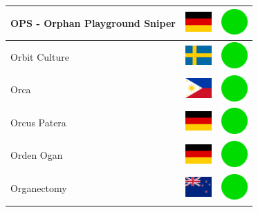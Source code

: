 \documentclass[12pt, a4paper, twoside]{report}
\begin{document}
\begin{center}
\begin{longtable}{|p{5cm}|p{2cm}|p{2cm}|}
 OPS - Orphan Playground Sniper                             & \includegraphics[width=1cm]{4x3/de} &   \includegraphics[width=1cm]{likes/y} \\ \hline
 Orbit Culture                                              & \includegraphics[width=1cm]{4x3/se} &   \includegraphics[width=1cm]{likes/y} \\ \hline
 Orca                                                       & \includegraphics[width=1cm]{4x3/ph} &   \includegraphics[width=1cm]{likes/y} \\ \hline
 Orcus Patera                                               & \includegraphics[width=1cm]{4x3/de} &   \includegraphics[width=1cm]{likes/y} \\ \hline
 Orden Ogan                                                 & \includegraphics[width=1cm]{4x3/de} &   \includegraphics[width=1cm]{likes/y} \\ \hline
 Organectomy                                                & \includegraphics[width=1cm]{4x3/nz} &   \includegraphics[width=1cm]{likes/y} \\ \hline

\end{longtable}
\end{center}
\end{document}
